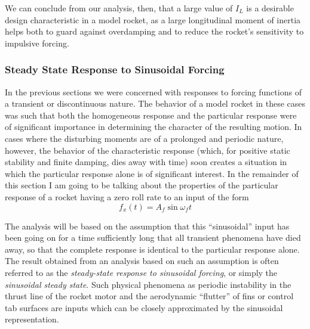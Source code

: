 We can conclude from our analysis, then, that a large value of $I_L$ is a
desirable design characteristic in a model rocket, as a large longitudinal
moment of inertia helps both to guard against overdamping and to reduce the
rocket's sensitivity to impulsive forcing.

\subsubsection{Steady State Response to Sinusoidal Forcing}\label{ch2:sec:3.1.4}

In the previous sections we were concerned with responses to forcing functions
of a transient or discontinuous nature. The behavior of a model rocket in
these cases was such that both the homogeneous response and the particular
response were of significant importance in determining the character of the
resulting motion. In cases where the disturbing moments are of a prolonged and
periodic nature, however, the behavior of the characteristic response (which,
for positive static stability and finite damping, dies away with time) soon
creates a situation in which the particular response alone is of significant
interest. In the remainder of this section I am going to be talking about the
properties of the particular response of a rocket having a zero roll rate to
an input of the form
\begin{equation*}
f_x(t) = A_f\sin\omega_f t
\end{equation*}

The analysis will be based on the assumption that this ``sinusoidal'' input
has been going on for a time sufficiently long that all transient phenomena
have died away, so that the complete response is identical to the particular
response alone. The result obtained from an analysis based on such an
assumption is often referred to as the \emph{steady-state response to
sinusoidal forcing}, or simply the \emph{sinusoidal steady state}. Such
physical phenomena as periodic instability in the thrust line of the rocket
motor and the aerodynamic ``flutter'' of fins or control tab surfaces are
inputs which can be closely approximated by the sinusoidal representation.


